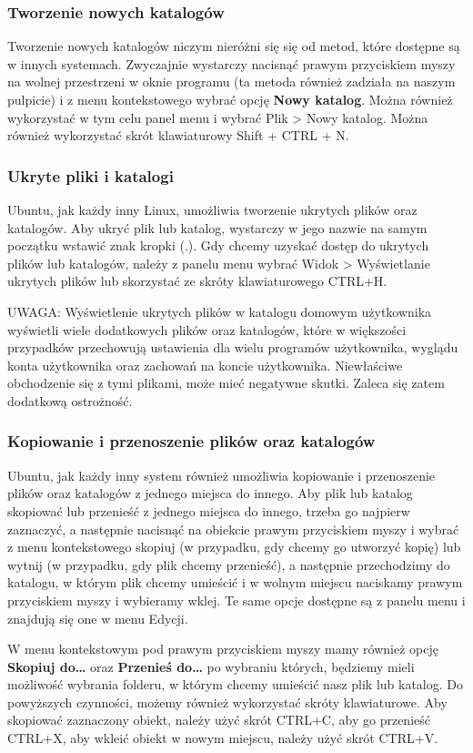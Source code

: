 \subsubsection{Tworzenie nowych katalogów}
Tworzenie nowych katalogów niczym nieróżni się się od metod, które dostępne są w innych systemach. Zwyczajnie wystarczy nacisnąć prawym przyciskiem myszy na wolnej przestrzeni w oknie programu (ta metoda również zadziała na naszym pulpicie) i z menu kontekstowego wybrać opcję \textbf{Nowy katalog}. Można również wykorzystać w tym celu panel menu i wybrać Plik > Nowy katalog. Można również wykorzystać skrót klawiaturowy Shift + CTRL + N.

\subsubsection{Ukryte pliki i katalogi}
Ubuntu, jak każdy inny Linux, umożliwia tworzenie ukrytych plików oraz katalogów. Aby ukryć plik lub katalog, wystarczy w jego nazwie na samym początku wstawić znak kropki (.). Gdy chcemy uzyskać dostęp do ukrytych plików lub katalogów, należy z panelu menu wybrać Widok > Wyświetlanie ukrytych plików lub skorzystać ze skróty klawiaturowego CTRL+H.

UWAGA: Wyświetlenie ukrytych plików w katalogu domowym użytkownika wyświetli wiele dodatkowych plików oraz katalogów, które w większości przypadków przechowują ustawienia dla wielu programów użytkownika, wyglądu konta użytkownika oraz zachowań na koncie użytkownika. Niewłaściwe obchodzenie się z tymi plikami, może mieć negatywne skutki. Zaleca się zatem dodatkową ostrożność.

\subsubsection{Kopiowanie i przenoszenie plików oraz katalogów}
Ubuntu, jak każdy inny system również umożliwia kopiowanie i przenoszenie plików oraz katalogów z jednego miejsca do innego. Aby plik lub katalog skopiować lub przenieść z jednego miejsca do innego, trzeba go najpierw zaznaczyć, a następnie nacisnąć na obiekcie prawym przyciskiem myszy i wybrać z menu kontekstowego skopiuj (w przypadku, gdy chcemy go utworzyć kopię) lub wytnij (w przypadku, gdy plik chcemy przenieść), a następnie przechodzimy do katalogu, w którym plik chcemy umieścić i w wolnym miejscu naciskamy prawym przyciskiem myszy i wybieramy wklej. Te same opcje dostępne są z panelu menu i znajdują się one w menu Edycji.

W menu kontekstowym pod prawym przyciskiem myszy mamy również opcję \textbf{Skopiuj do\ldots} oraz \textbf{Przenieś do\ldots} po wybraniu których, będziemy mieli możliwość wybrania folderu, w którym chcemy umieścić nasz plik lub katalog.
Do powyższych czynności, możemy również wykorzystać skróty klawiaturowe. Aby skopiować zaznaczony obiekt, należy użyć skrót CTRL+C, aby go przenieść CTRL+X, aby wkleić obiekt w nowym miejscu, należy użyć skrót CTRL+V.

